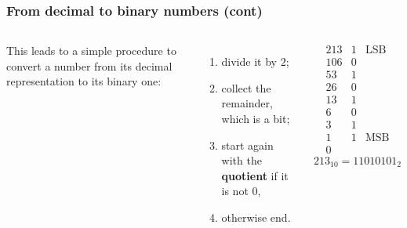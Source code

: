 % 
\begin{frame}
\frametitle{From decimal to binary numbers (cont)}

\begin{columns}
    This leads to a simple procedure to convert a number from its
    decimal representation to its binary one:

    \bigskip

    \begin{enumerate}

      \item divide it by \(2\);

      \item collect the remainder, which is a bit;

      \item start again with the \textbf{quotient} if it is not \(0\),

      \item otherwise end.

    \end{enumerate}

    \[
    \renewcommand\arraystretch{0.8}
    \begin{array}{r|ll}
      213 & 1 & \text{LSB}\\
      106 & 0 &\\
      53 & 1 &\\
      26 & 0 &\\
      13 & 1 &\\
      6 & 0 &\\
      3 & 1 &\\
      1 & 1 & \text{MSB}\\
      0 &   &
    \end{array}
    \]
    \[
    213_{10} = 11010101_2
    \]
\end{columns}

\end{frame}

